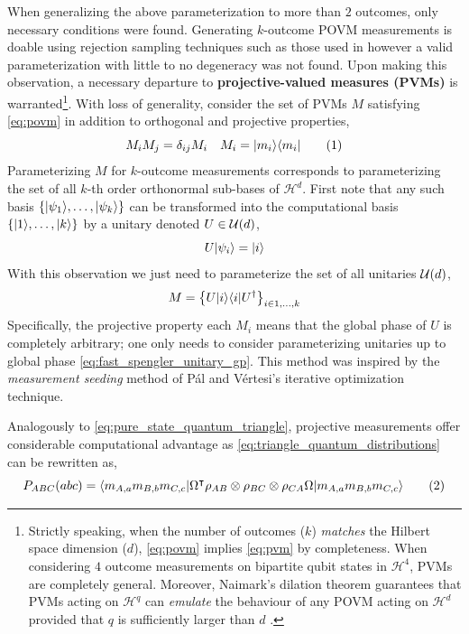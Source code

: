 \documentclass[aps, 10pt, english, twoside, pra, nofootinbib, longbibliography]{revtex4-1}
\theoremstyle{plain}
\theoremstyle{definition}
\theoremstyle{remark}
\newcommand{\Hilb}{\mathcal{H}}
\newcommand{\term}[1]{\textcolor{Mahogany}{\textbf{#1}}}
\begin{document}
    When generalizing the above parameterization to more than $2$ outcomes, only necessary conditions were found. Generating $k$-outcome POVM measurements is doable using rejection sampling techniques such as those used in \cite{Petz_2012} however a valid parameterization with little to no degeneracy was not found. Upon making this observation, a necessary departure to \term{projective-valued measures (PVMs)} is warranted\footnote{Strictly speaking, when the number of outcomes ($k$) \textit{matches} the Hilbert space dimension ($d$), \cref{eq:povm} implies \cref{eq:pvm} by completeness. When considering $4$ outcome measurements on bipartite qubit states in $\Hilb^4$, PVMs are completely general. Moreover, Naimark's dilation theorem guarantees that PVMs acting on $\Hilb^q$ can \textit{emulate} the behaviour of any POVM acting on $\Hilb^d$ provided that $q$ is sufficiently larger than $d$ \cite{Naimark}.}. With loss of generality, consider the set of PVMs $M$ satisfying \cref{eq:povm} in addition to orthogonal and projective properties,
    \[ M_i M_j = \de_{ij} M_i \quad M_i = \ket{m_i}\bra{m_i} \eq \label{eq:pvm}\]
    Parameterizing $M$ for $k$-outcome measurements corresponds to parameterizing the set of all $k$-th order orthonormal sub-bases of $\Hilb^d$.
    First note that any such basis $\bc{\ket{\psi_1}, \ldots, \ket{\psi_k}}$ can be transformed into the computational basis $\bc{\ket{1}, \ldots, \ket{k}}$ by a unitary denoted $U \in \mathcal{U}\br{d}$,
    \[ U \ket{\psi_i} = \ket{i} \]
    With this observation we just need to parameterize the set of all unitaries $\mathcal{U}\br{d}$,
    \[ M = \bc{ U\ket{i}\bra{i}U^\dagger }_{i \in 1, \ldots, k} \]
    Specifically, the projective property each $M_i$ means that the global phase of $U$ is completely arbitrary; one only needs to consider parameterizing unitaries up to global phase \cref{eq:fast_spengler_unitary_gp}. This method was inspired by the \textit{measurement seeding} method of P{\'{a}}l and V{\'{e}}rtesi's \cite{Pal_2010} iterative optimization technique.

    Analogously to \cref{eq:pure_state_quantum_triangle}, projective measurements offer considerable computational advantage as \cref{eq:triangle_quantum_distributions} can be rewritten as,
    \[ \prob[ABC]\br{abc} = \bramidket{m_{A,a}m_{B,b}m_{C,c}}{\Omega^\intercal \rho_{AB}\otimes\rho_{BC}\otimes\rho_{CA} \Omega}{m_{A,a}m_{B,b}m_{C,c}} \eq \label{eq:pure_meas_quantum_triangle} \]
\end{document}
